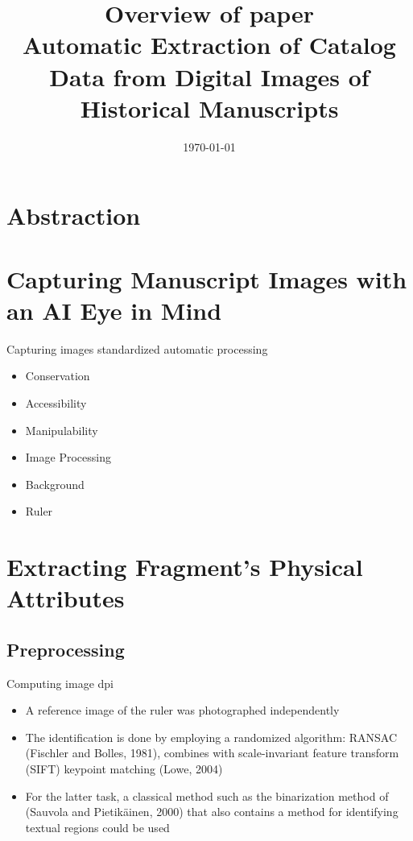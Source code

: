 \documentclass[12pt]{beamer}
\title[LaBRi]{Overview of paper \\Automatic Extraction of Catalog Data from Digital Images of Historical Manuscripts}
\author[Tu VU]{} %
\institute[LaBRi]{}
\date{\today}
\begin{document}
\begin{frame}
\titlepage
\end{frame}

\section{Abstraction}

\section{Capturing Manuscript Images with an AI Eye in Mind}
\begin{frame}{Capturing images standardized automatic processing}
\begin{itemize}
\item Conservation
\item Accessibility
\item Manipulability
\item Image Processing
\item Background
\item Ruler
\end{itemize}
\end{frame}

\section{Extracting Fragment’s Physical Attributes}
\subsection{Preprocessing}
\begin{frame}{Computing image dpi}
\begin{itemize}
\item A reference image of the ruler was photographed independently
\item The identification is done by employing a randomized algorithm: RANSAC
(Fischler and Bolles, 1981), combines with scale-invariant feature transform (SIFT) keypoint matching (Lowe, 2004)
\item For the latter task, a classical method such as the binarization method of (Sauvola and Pietikäinen, 2000) that also contains a method for identifying textual regions could be used
\end{itemize}
\end{frame}
\end{document}
